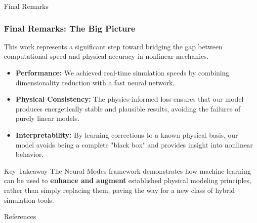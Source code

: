 \documentclass{beamer}
\begin{document}
\begin{frame}{Final Remarks}
    \frametitle{Final Remarks: The Big Picture}
    
    This work represents a significant step toward bridging the gap between computational speed and physical accuracy in nonlinear mechanics.
    
    \begin{itemize}
        \item \textbf{Performance:} We achieved real-time simulation speeds by combining dimensionality reduction with a fast neural network.
        \vspace{1em}
        
        \item \textbf{Physical Consistency:} The physics-informed loss ensures that our model produces energetically stable and plausible results, avoiding the failures of purely linear models.
        \vspace{1em}
        
        \item \textbf{Interpretability:} By learning corrections to a known physical basis, our model avoids being a complete "black box" and provides insight into nonlinear behavior.
    \end{itemize}
    
    \begin{alertblock}{Key Takeaway}
        The Neural Modes framework demonstrates how machine learning can be used to \textbf{enhance and augment} established physical modeling principles, rather than simply replacing them, paving the way for a new class of hybrid simulation tools.
    \end{alertblock}
\end{frame}

\begin{frame}[allowframebreaks]{References}
    \printbibliography[heading=none]
\end{frame}
\end{document}
